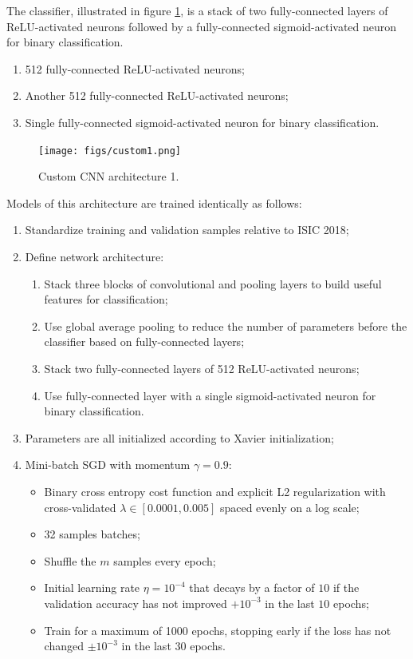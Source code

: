 The classifier, illustrated in figure \ref{fig:custom1}, is a stack of two fully-connected layers of ReLU-activated neurons followed by a fully-connected sigmoid-activated neuron for binary classification.

\begin{enumerate}
    \item 512 fully-connected ReLU-activated neurons;
    \item Another 512 fully-connected ReLU-activated neurons;
    \item Single fully-connected sigmoid-activated neuron for binary classification.
\end{enumerate}

\begin{figure}[ht]
    \centering
    \texttt{[image: figs/custom1.png]}
    \caption{Custom \ac{CNN} architecture 1.}
    \label{fig:custom1}
\end{figure}

Models of this architecture are trained identically as follows:

\begin{enumerate}
    \item Standardize training and validation samples relative to \ac{ISIC} 2018;
    \item Define network architecture:
        \begin{enumerate}
            \item Stack three blocks of convolutional and pooling layers to build useful features for classification;
            \item Use global average pooling to reduce the number of parameters before the classifier based on fully-connected layers;
            \item Stack two fully-connected layers of 512 ReLU-activated neurons;
            \item Use fully-connected layer with a single sigmoid-activated neuron for binary classification.
        \end{enumerate}
    \item Parameters are all initialized according to Xavier \cite{xavierinit} initialization;
    \item Mini-batch \ac{SGD} with momentum $\gamma = 0.9$:
        \begin{itemize}
            \item Binary cross entropy cost function and explicit L2 regularization with cross-validated $\lambda \in [0.0001, 0.005]$ spaced evenly on a log scale;
            \item 32 samples batches;
            \item Shuffle the $m$ samples every epoch;
            \item Initial learning rate $\eta = 10^{-4}$ that decays by a factor of $10$ if the validation accuracy has not improved $+10^{-3}$ in the last $10$ epochs;
            \item Train for a maximum of 1000 epochs, stopping early if the loss has not changed $\pm 10^{-3}$ in the last $30$ epochs.
        \end{itemize}
\end{enumerate}

